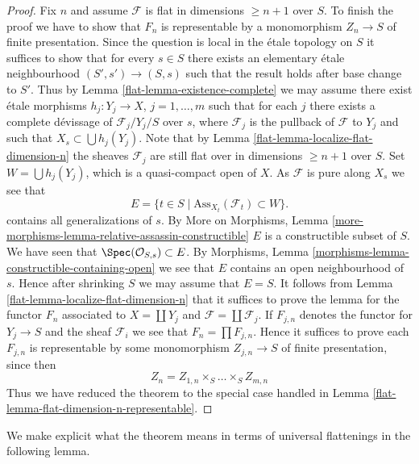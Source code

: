 \begin{proof}
\medskip\noindent
Fix $n$ and assume $\mathcal{F}$ is flat in dimensions $\geq n + 1$
over $S$. To finish the proof we have to show that $F_n$ is representable
by a monomorphism $Z_n \to S$ of finite presentation.
Since the question is local in the \'etale topology on $S$ it suffices to
show that for every $s \in S$ there exists an elementary \'etale neighbourhood
$(S', s') \to (S, s)$ such that the result holds after base change to $S'$.
Thus by
Lemma \ref{flat-lemma-existence-complete}
we may assume there exist \'etale morphisms $h_j : Y_j \to X$,
$j = 1, \ldots, m$ such that for each $j$ there exists a complete
d\'evissage of $\mathcal{F}_j/Y_j/S$ over $s$,
where $\mathcal{F}_j$ is the pullback of $\mathcal{F}$ to $Y_j$
and such that $X_s \subset \bigcup h_j(Y_j)$. Note that by
Lemma \ref{flat-lemma-localize-flat-dimension-n}
the sheaves $\mathcal{F}_j$ are still flat over in
dimensions $\geq n + 1$ over $S$.
Set $W = \bigcup h_j(Y_j)$, which is a quasi-compact open of $X$.
As $\mathcal{F}$ is pure along $X_s$ we see that
$$
E = \{t \in S \mid \text{Ass}_{X_t}(\mathcal{F}_t) \subset W \}.
$$
contains all generalizations of $s$. By
More on Morphisms,
Lemma \ref{more-morphisms-lemma-relative-assassin-constructible}
$E$ is a constructible subset of $S$. We have seen that
$\Spec(\mathcal{O}_{S, s}) \subset E$. By
Morphisms, Lemma \ref{morphisms-lemma-constructible-containing-open}
we see that $E$ contains an open neighbourhood of $s$.
Hence after shrinking $S$ we may assume that $E = S$.
It follows from
Lemma \ref{flat-lemma-localize-flat-dimension-n}
that it suffices to prove the lemma for the functor $F_n$ associated to
$X = \coprod Y_j$ and $\mathcal{F} = \coprod \mathcal{F}_j$.
If $F_{j, n}$ denotes the functor for $Y_j \to S$ and the sheaf
$\mathcal{F}_i$ we see that $F_n = \prod F_{j, n}$. Hence it suffices
to prove each $F_{j, n}$ is representable by some monomorphism
$Z_{j, n} \to S$ of finite presentation, since then
$$
Z_n = Z_{1, n} \times_S \ldots \times_S Z_{m, n}
$$
Thus we have reduced the theorem to the special case handled in
Lemma \ref{flat-lemma-flat-dimension-n-representable}.
\end{proof}

We make explicit what the theorem means in terms of universal
flattenings in the following lemma.

